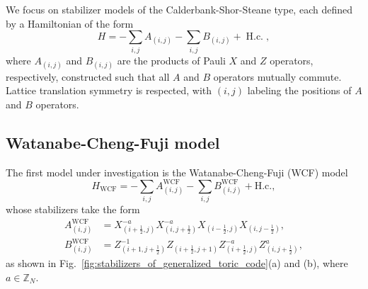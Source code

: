 \documentclass[aps,prb,english,superscriptaddress,twocolumn,tightenlines,showpacs,longbibliography,floatfix,amsfonts]{revtex4-2}
\begin{document}
We focus on stabilizer models of the Calderbank-Shor-Steane type, each defined by a Hamiltonian of the form
\begin{equation}
    H=-\sum_{i,j}A_{(i,j)}-\sum_{i,j}B_{(i,j)}+\operatorname{H.c.},\label{eq:Hamiltonian}
\end{equation}
where $A_{(i,j)}$ and $B_{(i,j)}$ are the products of Pauli $X$ and $Z$ operators, respectively, constructed such that all $A$ and $B$ operators mutually commute. Lattice translation symmetry is respected, with $(i,j)$ labeling the positions of $A$ and $B$ operators.

\subsection{Watanabe-Cheng-Fuji model\label{sec2a}}
The first model under investigation is the Watanabe-Cheng-Fuji (WCF) model~\cite{Watanabe2023}
\begin{equation}
H_{\mathrm{WCF}}=-\sum_{i,j}A_{\left(i,j\right)}^{\mathrm{WCF}}-\sum_{i,j}B_{\left(i,j\right)}^{\mathrm{WCF}}+\mathrm{H.c.}, \label{eq:WCF}
\end{equation}
whose stabilizers take the form
\begin{equation}
    \begin{aligned}
    A_{(i,j)}^{\operatorname{WCF}}&= X^{-a}_{(i+\frac{1}{2},j)}X^{-a}_{(i,j+\frac{1}{2})}X_{(i-\frac{1}{2},j)}X_{(i,j-\frac{1}{2})}, \\
    B_{(i,j)}^{\operatorname{WCF}}&= Z_{(i+1,j+\frac{1}{2})}^{-1}Z_{(i+\frac{1}{2},j+1)}Z^{-a}_{(i+\frac{1}{2},j)}Z^{a}_{(i,j+\frac{1}{2})},
\end{aligned}\label{eq:stabilizers of generalized toric code}
\end{equation}
as shown in Fig.~\ref{fig:stabilizers_of_generalized_toric_code}(a) and (b), where $a\in \mathbb{Z}_N$. 
\end{document}
